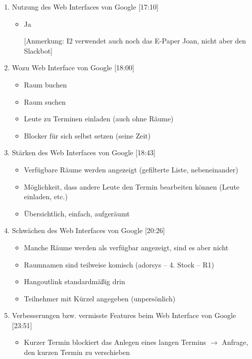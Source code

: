 \begin{enumerate}

    \item Nutzung des Web Interfaces von Google [17:10]
     \begin{itemize}
        \item Ja
        \item[] [Anmerkung: I2 verwendet auch noch das E-Paper Joan, nicht aber den Slackbot]
    \end{itemize}
    
    \item Wozu Web Interface von Google [18:00]
     \begin{itemize}
        \item Raum buchen
        \item Raum suchen
        \item Leute zu Terminen einladen (auch ohne Räume)
        \item Blocker für sich selbst setzen (seine Zeit)
    \end{itemize}
    
    \item Stärken des Web Interfaces von Google [18:43]
     \begin{itemize}
        \item Verfügbare Räume werden angezeigt (gefilterte Liste, nebeneinander)
        \item Möglichkeit, dass andere Leute den Termin bearbeiten können (Leute einladen, etc.)
        \item Übersichtlich, einfach, aufgeräumt
    \end{itemize}
    
    \item Schwächen des Web Interfaces von Google [20:26]
     \begin{itemize}
        \item Manche Räume werden als verfügbar angezeigt, sind es aber nicht
        \item Raumnamen sind teilweise komisch (adorsys – 4. Stock – R1)
        \item Hangoutlink standardmäßig drin
        \item Teilnehmer mit Kürzel angegeben (unpersönlich)
    \end{itemize}
    
    \item Verbesserungen bzw. vermisste Features beim Web Interface von Google [23:51]
     \begin{itemize}
        \item Kurzer Termin blockiert das Anlegen eines langen Termins $\rightarrow$ Anfrage, den kurzen Termin zu verschieben
    \end{itemize}
    

\end{enumerate}
